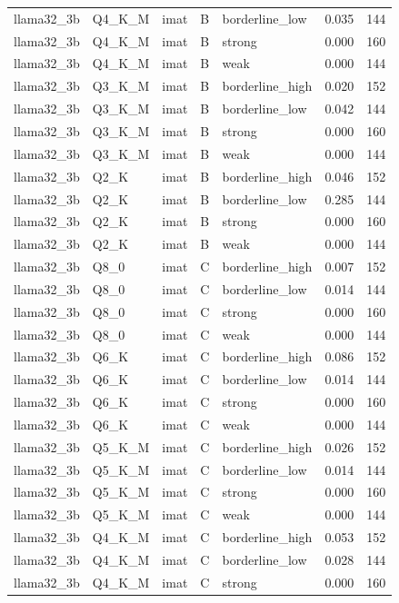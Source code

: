 \begin{tabular}{lllllrr}
llama32\_3b & Q4\_K\_M & imat & B & borderline\_low & 0.035 & 144 \\
llama32\_3b & Q4\_K\_M & imat & B & strong & 0.000 & 160 \\
llama32\_3b & Q4\_K\_M & imat & B & weak & 0.000 & 144 \\
llama32\_3b & Q3\_K\_M & imat & B & borderline\_high & 0.020 & 152 \\
llama32\_3b & Q3\_K\_M & imat & B & borderline\_low & 0.042 & 144 \\
llama32\_3b & Q3\_K\_M & imat & B & strong & 0.000 & 160 \\
llama32\_3b & Q3\_K\_M & imat & B & weak & 0.000 & 144 \\
llama32\_3b & Q2\_K & imat & B & borderline\_high & 0.046 & 152 \\
llama32\_3b & Q2\_K & imat & B & borderline\_low & 0.285 & 144 \\
llama32\_3b & Q2\_K & imat & B & strong & 0.000 & 160 \\
llama32\_3b & Q2\_K & imat & B & weak & 0.000 & 144 \\
llama32\_3b & Q8\_0 & imat & C & borderline\_high & 0.007 & 152 \\
llama32\_3b & Q8\_0 & imat & C & borderline\_low & 0.014 & 144 \\
llama32\_3b & Q8\_0 & imat & C & strong & 0.000 & 160 \\
llama32\_3b & Q8\_0 & imat & C & weak & 0.000 & 144 \\
llama32\_3b & Q6\_K & imat & C & borderline\_high & 0.086 & 152 \\
llama32\_3b & Q6\_K & imat & C & borderline\_low & 0.014 & 144 \\
llama32\_3b & Q6\_K & imat & C & strong & 0.000 & 160 \\
llama32\_3b & Q6\_K & imat & C & weak & 0.000 & 144 \\
llama32\_3b & Q5\_K\_M & imat & C & borderline\_high & 0.026 & 152 \\
llama32\_3b & Q5\_K\_M & imat & C & borderline\_low & 0.014 & 144 \\
llama32\_3b & Q5\_K\_M & imat & C & strong & 0.000 & 160 \\
llama32\_3b & Q5\_K\_M & imat & C & weak & 0.000 & 144 \\
llama32\_3b & Q4\_K\_M & imat & C & borderline\_high & 0.053 & 152 \\
llama32\_3b & Q4\_K\_M & imat & C & borderline\_low & 0.028 & 144 \\
llama32\_3b & Q4\_K\_M & imat & C & strong & 0.000 & 160 \\

\end{tabular}
